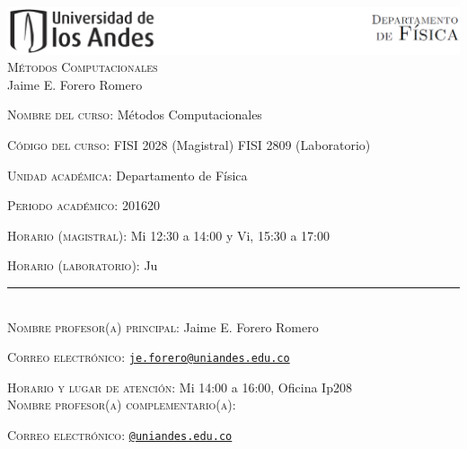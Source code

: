 \documentclass[letterpaper,10pt,onecolumn]{article}
\begin{document}
\begin{center}

\includegraphics[width=490pt]{header.png}\\[0.5cm]

\textsc{\LARGE M\'etodos Computacionales}\\[0.1cm]
\large Jaime E. Forero Romero\\[0.5cm]

\end{center}

\large \noindent\textsc{Nombre del curso:}  M\'etodos Computacionales%
  
\noindent\textsc{C\'odigo del curso:} FISI 2028 (Magistral) FISI 2809 (Laboratorio) %

\noindent\textsc{Unidad acad\'emica:} Departamento de F\'isica

\noindent\textsc{Periodo acad\'emico:} 201620 %

\noindent\textsc{Horario (magistral):} Mi 12:30 a 14:00 y Vi, 15:30 a
17:00 %

\noindent\textsc{Horario (laboratorio):} Ju\

\noindent\rule{\textwidth}{1pt}\\[-0.3cm]

\normalsize \noindent\textsc{Nombre profesor(a) principal:} Jaime
E. Forero Romero%

\noindent\textsc{Correo electr\'onico:}
\href{mailto:je.forero@uniandes.edu.co}{\nolinkurl{je.forero@uniandes.edu.co}}

\noindent\textsc{Horario y lugar de atenci\'on:} Mi 14:00 a 16:00, Oficina Ip208 
\\[-0.1cm]

\noindent\textsc{Nombre profesor(a) complementario(a):} %

\noindent\textsc{Correo electr\'onico:}
\href{mailto:@uniandes.edu.co}{\nolinkurl{@uniandes.edu.co}}

\end{document}
